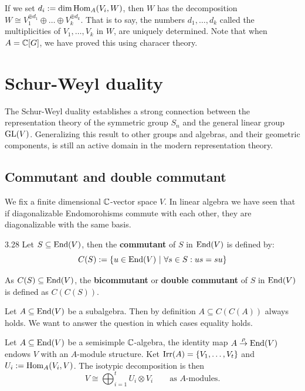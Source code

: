 \documentclass[twoside = false,	%
		headsepline,		%
		parskip = true,
		]{scrbook}						%
\begin{document}
        If we set $d_i := \dim\mathrm{Hom}_A(V_i, W)$, then $W$ has the decomposition $W\cong V_1^{\oplus d_1} \oplus \dots \oplus V_k^{\oplus d_k}$. That is to say, the numbers $d_1, \dots, d_k$ called the multiplicities of $V_1, \dots, V_k$ in $W$, are uniquely determined. Note that when $A=\mathbb C[G]$, we have proved this using characer theory.


\section{Schur-Weyl duality}

    The Schur-Weyl duality establishes a strong connection between the representation theory of the symmetric group $S_n$ and the general linear group $\mathrm{GL}(V)$. Generalizing this result to other groups and algebras, and their geometric components, is still an active domain in the modern representation theory.
    
    \subsection{Commutant and double commutant}

        We fix a finite dimensional $\mathbb C$-vector space $V$. In linear algebra we have seen that if diagonalizable Endomorohisms commute with each other, they are diagonalizable with the same basis.

        \begin{definition}{}{3.28}
            Let $S \subseteq \mathrm{End}(V)$, then the \textbf{commutant} of $S$ in $\mathrm{End}(V)$ is defined by:
            \begin{equation*}
                C(S):= \{u \in \mathrm{End}(V) \ | \ \forall s \in S: us = su \}
            \end{equation*}

            As $C(S) \subseteq \mathrm{End}(V)$, the \textbf{bicommutant} or \textbf{double commutant} of $S$ in $\mathrm{End}(V)$ is defined as $C(C(S))$.
        \end{definition}
        
        Let $A\subseteq \mathrm{End}(V)$ be a subalgebra. Then by definition $A\subseteq C(C(A))$ always holds. We want to answer the question in which cases equality holds.

        Let $A\subseteq \mathrm{End}(V)$ be a semisimple $\mathbb C$-algebra, the identity map $A\overset\rho\rightarrow\mathrm{End}(V)$ endows $V$ with an $A$-module structure. Ket $\mathrm{Irr}(A)=\left\{ V_1, \dots, V_t\right\}$ and $U_i := \mathrm{Hom}_A(V_i,V)$. 
        The isotypic decomposition is then $$V\cong \bigoplus_{i=1}^t U_i\otimes V_i \qquad \text{as $A$-modules.}$$
\end{document}
